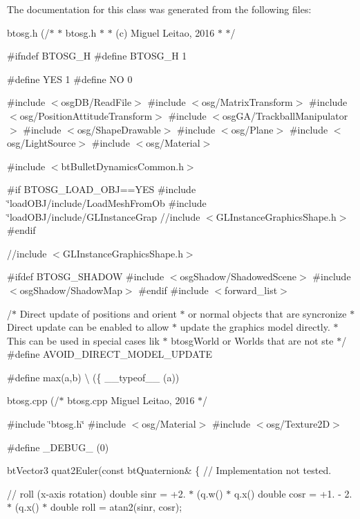 The documentation for this class was generated from the following files\+:\begin{DoxyCompactItemize}
\item 
btosg.\+h (/$\ast$
 $\ast$	btosg.\+h
 $\ast$
 $\ast$	(c) Miguel Leitao, 2016
 $\ast$
 $\ast$/

\#ifndef B\+T\+O\+S\+G\+\_\+\+H
\#define B\+T\+O\+S\+G\+\_\+\+H 1

\#define Y\+E\+S 1
\#define N\+O  0

\#include $<$osg\+D\+B/\+Read\+File$>$
\#include $<$osg/\+Matrix\+Transform$>$
\#include $<$osg/\+Position\+Attitude\+Transform$>$
\#include $<$osg\+G\+A/\+Trackball\+Manipulator$>$
\#include $<$osg/\+Shape\+Drawable$>$
\#include $<$osg/\+Plane$>$
\#include $<$osg/\+Light\+Source$>$
\#include $<$osg/\+Material$>$

\#include $<$bt\+Bullet\+Dynamics\+Common.\+h$>$

\#if B\+T\+O\+S\+G\+\_\+\+L\+O\+A\+D\+\_\+\+O\+B\+J==\+Y\+E\+S
\#include \char`\"{}load\+O\+B\+J/include/\+Load\+Mesh\+From\+Ob
\#include \char`\"{}load\+O\+B\+J/include/\+G\+L\+Instance\+Grap
//include $<$\+G\+L\+Instance\+Graphics\+Shape.\+h$>$
\#endif

//include $<$\+G\+L\+Instance\+Graphics\+Shape.\+h$>$

\#ifdef B\+T\+O\+S\+G\+\_\+\+S\+H\+A\+D\+O\+W
\#include $<$osg\+Shadow/\+Shadowed\+Scene$>$
\#include $<$osg\+Shadow/\+Shadow\+Map$>$
\#endif
\#include $<$forward\+\_\+list$>$

/$\ast$ Direct update of positions and orient
 $\ast$ or normal objects that are syncronize
 $\ast$ Direct update can be enabled to allow
 $\ast$ update the graphics model directly.
 $\ast$ This can be used in special cases lik
 $\ast$ btosg\+World or Worlds that are not ste
 $\ast$/
\#define A\+V\+O\+I\+D\+\_\+\+D\+I\+R\+E\+C\+T\+\_\+\+M\+O\+D\+E\+L\+\_\+\+U\+P\+D\+A\+T\+E

\#define max(a,b) \textbackslash{}
   (\{ \+\_\+\+\_\+typeof\+\_\+\+\_\+ (a))\item 
btosg.\+cpp (/$\ast$
	btosg.\+cpp
	\+Miguel Leitao, 2016
$\ast$/

\#include \char`\"{}btosg.\+h\char`\"{}
\#include $<$osg/\+Material$>$
\#include $<$osg/\+Texture2\+D$>$

\#define \+\_\+\+D\+E\+B\+U\+G\+\_\+ (0)

bt\+Vector3 quat2\+Euler(const bt\+Quaternion\&
\{
    // Implementation not tested.

    // roll (x-\/axis rotation)
    double sinr = +2. $\ast$ (q.\+w() $\ast$ q.\+x() 
    double cosr = +1. -\/ 2. $\ast$ (q.\+x() $\ast$ 
    double roll = atan2(sinr, cosr);


\end{DoxyCompactItemize}
